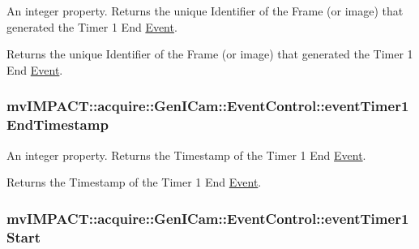 An integer property. Returns the unique Identifier of the Frame (or image) that generated the Timer 1 End \hyperlink{classmv_i_m_p_a_c_t_1_1acquire_1_1_event}{Event}. 

Returns the unique Identifier of the Frame (or image) that generated the Timer 1 End \hyperlink{classmv_i_m_p_a_c_t_1_1acquire_1_1_event}{Event}. \hypertarget{classmv_i_m_p_a_c_t_1_1acquire_1_1_gen_i_cam_1_1_event_control_a20186a35955fc0bba415c806a182a9bb}{
\subsubsection[{event\+Timer1\+End\+Timestamp}]{ mv\+I\+M\+P\+A\+C\+T\+::acquire\+::\+Gen\+I\+Cam\+::\+Event\+Control\+::event\+Timer1\+End\+Timestamp}}\label{classmv_i_m_p_a_c_t_1_1acquire_1_1_gen_i_cam_1_1_event_control_a20186a35955fc0bba415c806a182a9bb}


An integer property. Returns the Timestamp of the Timer 1 End \hyperlink{classmv_i_m_p_a_c_t_1_1acquire_1_1_event}{Event}. 

Returns the Timestamp of the Timer 1 End \hyperlink{classmv_i_m_p_a_c_t_1_1acquire_1_1_event}{Event}. \hypertarget{classmv_i_m_p_a_c_t_1_1acquire_1_1_gen_i_cam_1_1_event_control_aa4a2c6fdc4028c75cc5c03682c9f6fad}{
\subsubsection[{event\+Timer1\+Start}]{ mv\+I\+M\+P\+A\+C\+T\+::acquire\+::\+Gen\+I\+Cam\+::\+Event\+Control\+::event\+Timer1\+Start}}\label{classmv_i_m_p_a_c_t_1_1acquire_1_1_gen_i_cam_1_1_event_control_aa4a2c6fdc4028c75cc5c03682c9f6fad}


